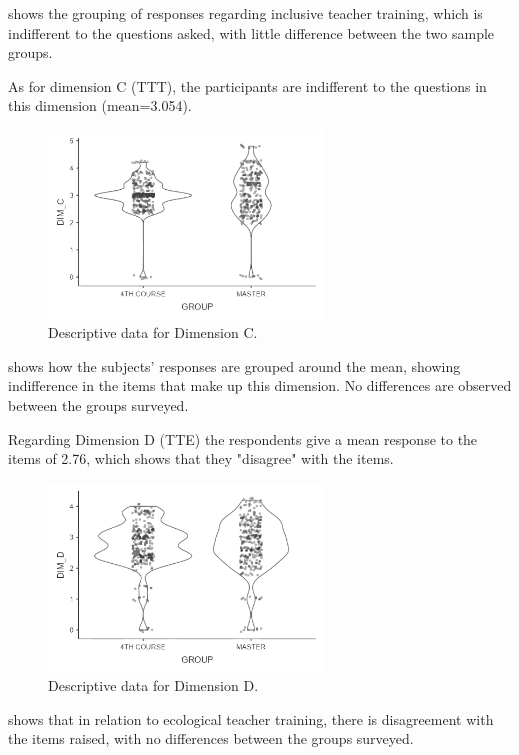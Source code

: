 \documentclass{textolivre}
\begin{document}
 shows the grouping of responses regarding inclusive teacher training, which is indifferent to the questions asked, with little difference between the two sample groups.

As for dimension C (TTT), the participants are indifferent to the questions in this dimension (mean=3.054).

\begin{figure}[htbp]
 \centering
 \includegraphics[width=0.65\textwidth]{fig3.pdf}
 \caption{Descriptive data for Dimension C.}
 \label{fig3}
\end{figure}

 shows how the subjects’ responses are grouped around the mean, showing indifference in the items that make up this dimension. No differences are observed between the groups surveyed.

Regarding Dimension D (TTE) the respondents give a mean response to the items of 2.76, which shows that they "disagree" with the items.

\begin{figure}[htbp]
 \centering
 \includegraphics[width=0.65\textwidth]{fig4.pdf}
 \caption{Descriptive data for Dimension D.}
 \label{fig4}
\end{figure}

 shows that in relation to ecological teacher training, there is disagreement with the items raised, with no differences between the groups surveyed.
\end{document}
